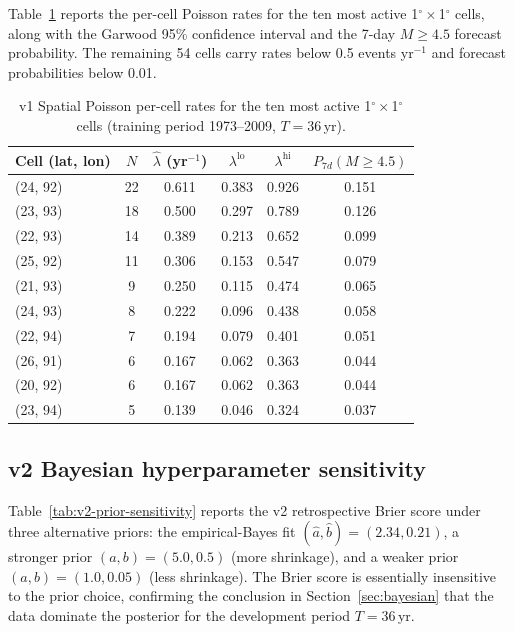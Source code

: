 \documentclass[10pt,a4paper,twocolumn]{article}
\begin{document}
Table~\ref{tab:v1-cell-rates} reports the per-cell Poisson rates for the ten most active 1$^\circ\times$1$^\circ$ cells, along with the Garwood 95\% confidence interval and the 7-day $M\geq4.5$ forecast probability. The remaining 54 cells carry rates below 0.5 events yr$^{-1}$ and forecast probabilities below 0.01.

\begin{table}[t]
\centering
\caption{v1 Spatial Poisson per-cell rates for the ten most active 1$^\circ\times$1$^\circ$ cells (training period 1973--2009, $T=36$\,yr).}\label{tab:v1-cell-rates}
\small
\begin{tabular*}{\columnwidth}{@{\extracolsep{\fill}}lccccc}
\toprule
Cell (lat, lon) & $N$ & $\hat\lambda$ (yr$^{-1}$) & $\lambda^{\text{lo}}$ & $\lambda^{\text{hi}}$ & $P_{7d}(M\geq4.5)$ \\
\midrule
(24, 92) & 22 & 0.611 & 0.383 & 0.926 & 0.151 \\
(23, 93) & 18 & 0.500 & 0.297 & 0.789 & 0.126 \\
(22, 93) & 14 & 0.389 & 0.213 & 0.652 & 0.099 \\
(25, 92) & 11 & 0.306 & 0.153 & 0.547 & 0.079 \\
(21, 93) & 9  & 0.250 & 0.115 & 0.474 & 0.065 \\
(24, 93) & 8  & 0.222 & 0.096 & 0.438 & 0.058 \\
(22, 94) & 7  & 0.194 & 0.079 & 0.401 & 0.051 \\
(26, 91) & 6  & 0.167 & 0.062 & 0.363 & 0.044 \\
(20, 92) & 6  & 0.167 & 0.062 & 0.363 & 0.044 \\
(23, 94) & 5  & 0.139 & 0.046 & 0.324 & 0.037 \\
\bottomrule
\end{tabular*}
\end{table}

\subsection{v2 Bayesian hyperparameter sensitivity}

Table~\ref{tab:v2-prior-sensitivity} reports the v2 retrospective Brier score under three alternative priors: the empirical-Bayes fit $(\hat a, \hat b) = (2.34, 0.21)$, a stronger prior $(a, b) = (5.0, 0.5)$ (more shrinkage), and a weaker prior $(a, b) = (1.0, 0.05)$ (less shrinkage). The Brier score is essentially insensitive to the prior choice, confirming the conclusion in Section~\ref{sec:bayesian} that the data dominate the posterior for the development period $T=36$\,yr.
\end{document}
